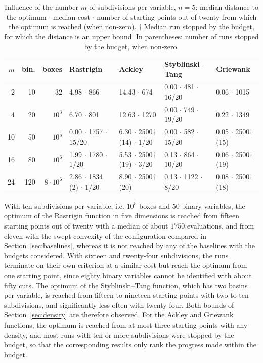 \documentclass[pdflatex,sn-basic]{sn-jnl}
\begin{document}
\begin{table}[t]
  \centering
  \caption{Influence of the number $m$ of subdivisions per variable, $n=5$:
    median distance to the optimum $\cdot$ median cost $\cdot$ number of starting
    points out of twenty from which the optimum is reached (when non-zero).
    $\dagger$ Median run stopped by the budget, for which the distance is an
    upper bound. In parentheses: number of runs stopped by the budget, when
    non-zero.}
  \label{tab:density}
  \scriptsize
  \setlength{\tabcolsep}{3pt}
  \begin{tabular}{rrrllll}
    \toprule
    $m$ & bin. & boxes & Rastrigin & Ackley & Styblinski--Tang & Griewank \\
    \midrule
    2  & 10  & $32$            & 4.98 $\cdot$ 866                & 14.43 $\cdot$ 674                    & 0.00 $\cdot$ 481 $\cdot$ 16/20  & 0.06 $\cdot$ 1015 \\
    4  & 20  & $10^3$          & 6.70 $\cdot$ 801                & 12.63 $\cdot$ 1270                   & 0.00 $\cdot$ 749 $\cdot$ 19/20  & 0.22 $\cdot$ 1349 \\
    10 & 50  & $10^5$          & 0.00 $\cdot$ 1757 $\cdot$ 15/20 & 6.30 $\cdot$ 2500$\dagger$ (14) $\cdot$ 1/20 & 0.00 $\cdot$ 582 $\cdot$ 15/20  & 0.05 $\cdot$ 2500$\dagger$ (15) \\
    16 & 80  & $10^6$          & 1.99 $\cdot$ 1780 $\cdot$ 1/20  & 5.53 $\cdot$ 2500$\dagger$ (19) $\cdot$ 3/20 & 0.13 $\cdot$ 864 $\cdot$ 10/20  & 0.06 $\cdot$ 2500$\dagger$ (19) \\
    24 & 120 & $8\cdot 10^6$   & 2.86 $\cdot$ 1834 (2) $\cdot$ 1/20  & 8.90 $\cdot$ 2500$\dagger$ (20)           & 0.13 $\cdot$ 1122 $\cdot$ 8/20  & 0.08 $\cdot$ 2500$\dagger$ (18) \\
    \bottomrule
  \end{tabular}
\end{table}

With ten subdivisions per variable, i.e. $10^5$ boxes and $50$ binary variables,
the optimum of the Rastrigin function in five dimensions is reached from
fifteen starting points out of twenty with a median of about $1750$ evaluations,
and from eleven with the swept convexity of the configuration compared in
Section~\ref{sec:baselines}, whereas it is not reached by any of the baselines
with the budgets considered. With sixteen and twenty-four subdivisions, the runs
terminate on their own criterion at a similar cost but reach the optimum from
one starting point, since eighty binary variables cannot be identified with
about fifty cuts. The optimum of the Styblinski--Tang function, which has two
basins per variable, is reached from fifteen to nineteen starting points with
two to ten subdivisions, and significantly less often with twenty-four. Both
bounds of Section~\ref{sec:density} are therefore observed. For the Ackley and
Griewank functions, the optimum is reached from at most three starting points
with any density, and most runs with ten or more subdivisions were stopped by
the budget, so that the corresponding results only rank the progress made within
the budget.
\end{document}
